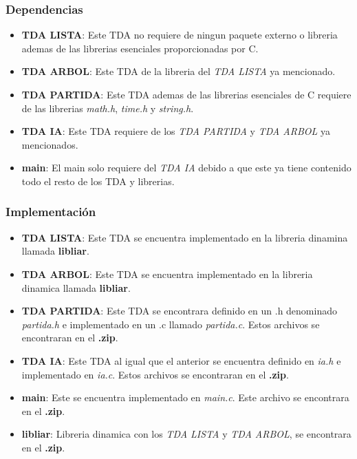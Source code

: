 \documentclass[12pt,twocolum,a4paper]{article}
\begin{document}
\subsubsection{Dependencias}
\begin{itemize}
    \item {\bf TDA LISTA}: Este TDA no requiere de ningun paquete externo o libreria ademas de las librerias esenciales proporcionadas por C.
    \item {\bf TDA ARBOL}: Este TDA de la libreria del {\itshape TDA LISTA} ya mencionado.
    \item {\bf TDA PARTIDA}: Este TDA ademas de las librerias esenciales de C requiere de las  librerias {\itshape math.h}, {\itshape time.h} y {\itshape string.h}.
    \item {\bf TDA IA}: Este TDA requiere de los {\itshape TDA PARTIDA} y {\itshape TDA ARBOL} ya mencionados.
    \item {\bf main}: El main solo requiere del {\itshape TDA IA} debido a que este ya tiene contenido todo el resto de los TDA y librerias.
\end{itemize}

\subsubsection{Implementaci\'on}
\begin{itemize}
    \item {\bf TDA LISTA}: Este TDA se encuentra implementado en la libreria dinamina llamada {\bf libliar}.
    \item {\bf TDA ARBOL}: Este TDA se encuentra implementado en la libreria dinamica llamada {\bf libliar}.
    \item {\bf TDA PARTIDA}: Este TDA se encontrara definido en un .h denominado {\itshape partida.h} e implementado en un .c llamado {\itshape partida.c}. Estos archivos se encontraran en el {\bf .zip}.
    \item {\bf TDA IA}: Este TDA al igual que el anterior se encuentra definido en {\itshape ia.h} e implementado en {\itshape ia.c}. Estos archivos se encontraran en el {\bf .zip}.
    \item {\bf main}: Este se encuentra implementado en {\itshape main.c}. Este archivo se encontrara en el {\bf .zip}.
    \item {\bf libliar}: Libreria dinamica con los {\itshape TDA LISTA} y {\itshape TDA ARBOL}, se encontrara en el {\bf .zip}.
\end{itemize}
\end{document}
